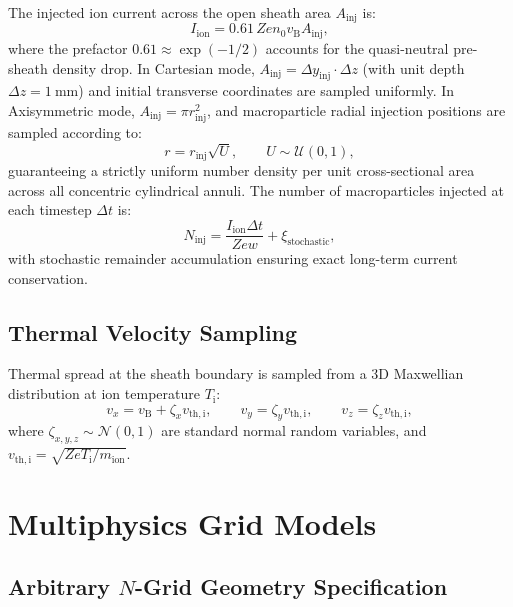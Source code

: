 \documentclass[11pt,a4paper]{article}
\begin{document}
The injected ion current across the open sheath area $A_{\mathrm{inj}}$ is:
\begin{equation}
    I_{\mathrm{ion}} = 0.61\, Z e n_{0} v_{\mathrm{B}} A_{\mathrm{inj}},
\end{equation}
where the prefactor $0.61 \approx \exp(-1/2)$ accounts for the quasi-neutral pre-sheath density drop. In Cartesian mode, $A_{\mathrm{inj}} = \Delta y_{\mathrm{inj}} \cdot \Delta z$ (with unit depth $\Delta z = \SI{1}{\milli\meter}$) and initial transverse coordinates are sampled uniformly. In Axisymmetric mode, $A_{\mathrm{inj}} = \pi r_{\mathrm{inj}}^2$, and macroparticle radial injection positions are sampled according to:
\begin{equation}
    r = r_{\mathrm{inj}} \sqrt{U}, \qquad U \sim \mathcal{U}(0, 1),
\end{equation}
guaranteeing a strictly uniform number density per unit cross-sectional area across all concentric cylindrical annuli. The number of macroparticles injected at each timestep $\Delta t$ is:
\begin{equation}
    N_{\mathrm{inj}} = \frac{I_{\mathrm{ion}} \Delta t}{Z e w} + \xi_{\mathrm{stochastic}},
\end{equation}
with stochastic remainder accumulation ensuring exact long-term current conservation.

\subsection{Thermal Velocity Sampling}

Thermal spread at the sheath boundary is sampled from a 3D Maxwellian distribution at ion temperature $T_{\mathrm{i}}$:
\begin{equation}
    v_x = v_{\mathrm{B}} + \zeta_x v_{\mathrm{th,i}}, \qquad
    v_y = \zeta_y v_{\mathrm{th,i}}, \qquad
    v_z = \zeta_z v_{\mathrm{th,i}},
\end{equation}
where $\zeta_{x,y,z} \sim \mathcal{N}(0, 1)$ are standard normal random variables, and $v_{\mathrm{th,i}} = \sqrt{Z e T_{\mathrm{i}} / m_{\mathrm{ion}}}$.

\section{Multiphysics Grid Models}

\subsection{Arbitrary $N$-Grid Geometry Specification}
\end{document}

